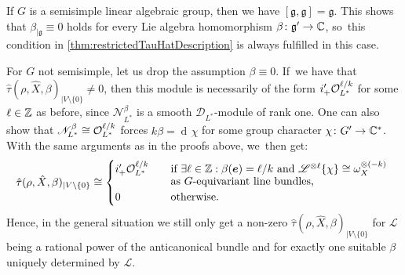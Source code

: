 \documentclass[11pt]{article}
\newcommand{\bme}{{\boldsymbol{e}}}
\newcommand{\Ell}{\mathscr{L}}
\newcommand{\frg}{\mathfrak{g}}
\DeclareMathOperator{\differential}{d\!}
\newcommand\restr[2]{{#1_{| {#2}}}}
\begin{document}
\begin{rmk}
If $G$ is a semisimple linear algebraic group, then we have $[\frg, \frg] = \frg$. This shows that $\restr{\beta}{\frg} \equiv 0$ holds for every Lie algebra homomorphism $\beta \colon \frg' \to \C$, so~this condition in \cref{thm:restrictedTauHatDescription} is always fulfilled in this case.
\end{rmk}

\begin{rmk}
For $G$ not semisimple, let us drop the assumption $\beta \equiv 0$. If~we have that $\restr{\hat{\tau}(\rho,\hat X, \beta)}{V \setminus \{0\}} \neq 0$,
then this module is necessarily of the form $i'_+\mathcal{O}_{L^*}^{\ell/k}$ for some $\ell \in {\mathbb Z}$ as before, since $\mathscr N_{L^*}^\beta$ is a smooth $\mathscr D_{L^*}$\nobreakdash-mod\-ule of rank one.
One can also show that $\mathscr N_{L^*}^\beta \cong \mathcal{O}_{L^*}^{\ell/k}$ forces $k\beta = \differential \chi$ for some group character $\chi \colon G' \to {\mathbb C}^*$.
With the same arguments as in the proofs above, we~then get:
\[
\restr{\hat{\tau}(\rho, \hat{X}, \beta)}{V \setminus \{0\}} \cong
\begin{cases}
i'_+ \O_{L^*}^{\ell/k} & \quad\text{if $\exists \ell \in \Z: \beta(\bme) = \ell/k$ and $\Ell^{\otimes \ell}\{\chi\} \cong \omega_X^{\otimes (-k)}$ } \\[-3pt]
& \quad\text{as $G$-equivariant line bundles,} \\
0 & \quad\text{otherwise.}
\end{cases}
\]
Hence, in the general situation we still only get a non-zero $\restr{\hat\tau(\rho, \hat X, \beta)}{V \setminus \{0\}}$ for $\Ell$ being a rational power of the anticanonical bundle and for exactly one suitable $\beta$ uniquely determined by $\Ell$.
\end{rmk}
\end{document}
